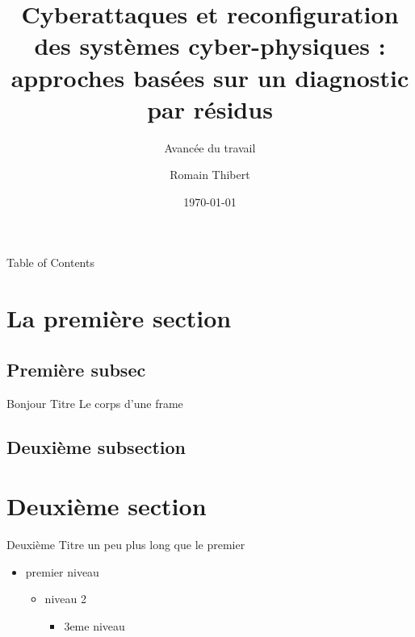 \documentclass[aspectratio=169]{beamer}
\title{Cyberattaques et reconfiguration des systèmes cyber-physiques : approches basées sur un diagnostic par résidus}
\subtitle{Avancée du travail}
\author[R. Thibert]{Romain Thibert}
\date[2022]{\today}
\begin{document}

\begin{frame}{Table of Contents}
\tableofcontents
\end{frame}

\section{La première section}

\subsection{Première subsec}

\begin{frame}{Bonjour Titre}
Le corps d'une frame
\end{frame}

\subsection{Deuxième subsection}

\section{Deuxième section}

\begin{frame}{Deuxième Titre un peu plus long que le premier}
\begin{itemize}
    \item premier niveau
    \begin{itemize}
        \item niveau 2
        \begin{itemize}
            \item 3eme niveau
        \end{itemize}
    \end{itemize}
\end{itemize}
\end{frame}

\end{document}
